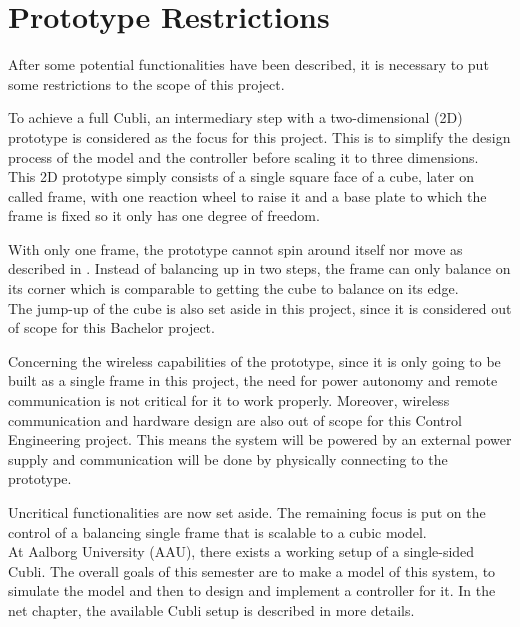 \section{Prototype Restrictions}\label{sec:protoRestrictions}
After some potential functionalities have been described, it is necessary to put some restrictions to the scope of this project.

To achieve a full Cubli, an intermediary step with a two-dimensional (2D) prototype is considered as the focus for this project. This is to simplify the design process of the model and the controller before scaling it to three dimensions.\\
This 2D prototype simply consists of a single square face of a cube, later on called frame, with one reaction wheel to raise it and a base plate to which the frame is fixed so it only has one degree of freedom.

With only one frame, the prototype cannot spin around itself nor move as described in . Instead of balancing up in two steps, the frame can only balance on its corner which is comparable to getting the cube to balance on its edge.\\
The jump-up of the cube is also set aside in this project, since it is considered out of scope for this Bachelor project.

Concerning the wireless capabilities of the prototype, since it is only going to be built as a single frame in this project, the need for power autonomy and remote communication is not critical for it to work properly. Moreover, wireless communication and hardware design are also out of scope for this Control Engineering project. This means the system will be powered by an external power supply and communication will be done by physically connecting to the prototype.

Uncritical functionalities are now set aside. The remaining focus is put on the control of a balancing single frame that is scalable to a cubic model.\\
At Aalborg University (AAU), there exists a working setup of a single-sided Cubli. The overall goals of this semester are to make a model of this system, to simulate the model and then to design and implement a controller for it.
In the net chapter, the available Cubli setup is described in more details.



